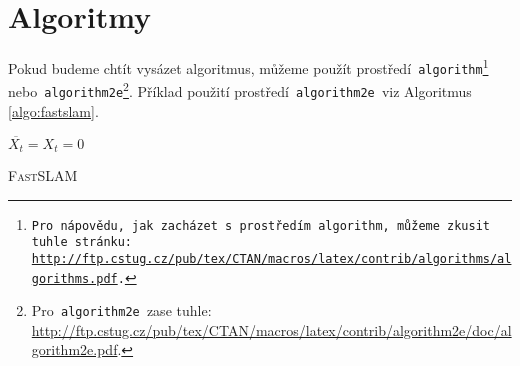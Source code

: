 \documentclass[hidelinks, 11pt, a4paper]{article}
\begin{document}
\section{Algoritmy}
\label{sec:Algoritmy}
Pokud budeme chtít vysázet algoritmus, můžeme použít prostředí\texttt{ algorithm\footnote[2]{Pro nápovědu, jak zacházet s~prostředím\texttt{ algorithm,} můžeme zkusit tuhle stránku:\\
 \href{http://ftp.cstug.cz/pub/tex/CTAN/macros/latex/contrib/algorithms/algorithms.pdf}{http://ftp.cstug.cz/pub/tex/CTAN/macros/latex/contrib/algorithms/algorithms.pdf}.} }
nebo\texttt{ algorithm2e}\footnote[3]{Pro\texttt{ algorithm2e }zase tuhle: \href{http://ftp.cstug.cz/pub/tex/CTAN/macros/latex/contrib/algorithm2e/doc/algorithm2e.pdf}{http://ftp.cstug.cz/pub/tex/CTAN/macros/latex/contrib/algorithm2e/doc/algorithm2e.pdf}.}. Příklad použití prostředí\texttt{ algorithm2e }viz Algoritmus \ref{algo:fastslam}.\\

\begin{algorithm}[ht]
    \SetAlgoNoLine
    
    \SetNlSty{}{}{:}
    \SetNlSkip{-1.2em}
    \BlankLine
    \DontPrintSemicolon
    \Indentp{1.7em}
    $\overline{X_t} = X_t = 0$\;
    \caption{\textsc{FastSLAM}}
    \label{algo:fastslam}
\end{algorithm}
\end{document}
